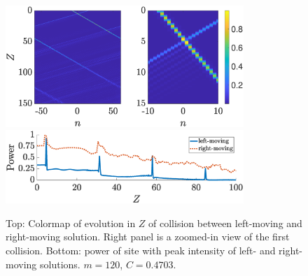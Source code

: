 \documentclass[reprint, amsmath,amssymb,aps,pre]{revtex4-2}
\begin{document}
\begin{figure}
    \centering
    \includegraphics[width=9cm]{images/collision1.eps}
    \includegraphics[width=9cm]{images/collision1power.eps}
    \caption{Top: Colormap of evolution in $Z$ of collision between left-moving and right-moving solution. Right panel is a zoomed-in view of the first collision. Bottom: power of site with peak intensity of left- and right-moving solutions.
    $m=120$, $C=0.4703$.}
    \label{fig:collision1}
\end{figure}




\end{document}
